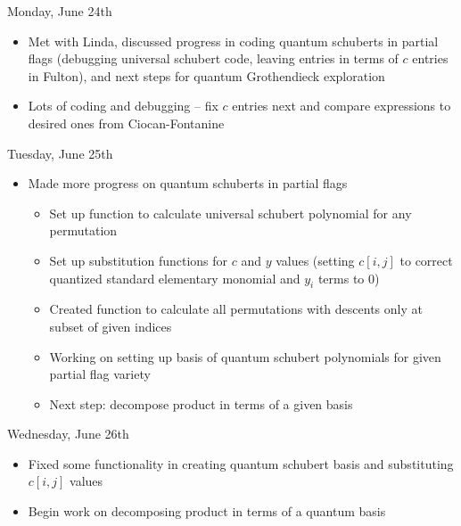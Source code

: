 Monday, June 24th
\begin{itemize}
    \item Met with Linda, discussed progress in coding quantum schuberts in partial flags (debugging universal schubert code, leaving entries in terms of $c$ entries in Fulton), and next steps for quantum Grothendieck exploration
    \item Lots of coding and debugging -- fix $c$ entries next and compare expressions to desired ones from Ciocan-Fontanine
\end{itemize}

Tuesday, June 25th
\begin{itemize}
    \item Made more progress on quantum schuberts in partial flags
    \begin{itemize}
        \item Set up function to calculate universal schubert polynomial for any permutation
        \item Set up substitution functions for $c$ and $y$ values (setting $c[i, j]$ to correct quantized standard elementary monomial and $y_i$ terms to $0$)
        \item Created function to calculate all permutations with descents only at subset of given indices
        \item Working on setting up basis of quantum schubert polynomials for given partial flag variety
        \item Next step: decompose product in terms of a given basis
    \end{itemize}
\end{itemize}

Wednesday, June 26th
\begin{itemize}
    \item Fixed some functionality in creating quantum schubert basis and substituting $c[i, j]$ values
    \item Begin work on decomposing product in terms of a quantum basis
\end{itemize}
